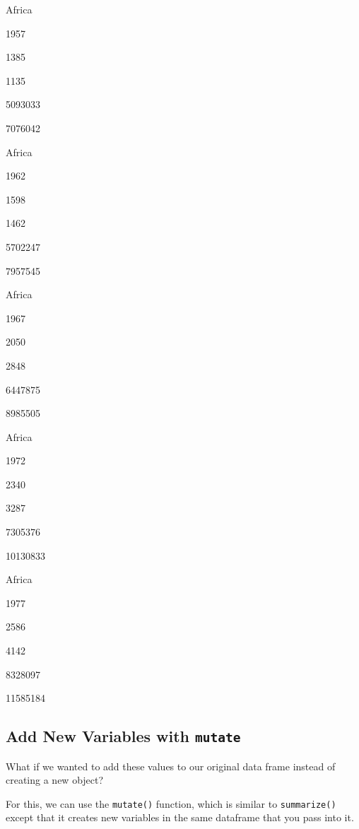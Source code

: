 \documentclass[]{book}
\newenvironment{Shaded}{\begin{snugshade}}{\end{snugshade}}
\newcommand{\KeywordTok}[1]{\textcolor[rgb]{0.13,0.29,0.53}{\textbf{#1}}}
\newcommand{\DataTypeTok}[1]{\textcolor[rgb]{0.13,0.29,0.53}{#1}}
\newcommand{\StringTok}[1]{\textcolor[rgb]{0.31,0.60,0.02}{#1}}
\newcommand{\OperatorTok}[1]{\textcolor[rgb]{0.81,0.36,0.00}{\textbf{#1}}}
\newcommand{\NormalTok}[1]{#1}
\begin{document}
Africa

1957

1385

1135

5093033

7076042

Africa

1962

1598

1462

5702247

7957545

Africa

1967

2050

2848

6447875

8985505

Africa

1972

2340

3287

7305376

10130833

Africa

1977

2586

4142

8328097

11585184

\subsection{\texorpdfstring{Add New Variables with
\texttt{mutate}}{Add New Variables with mutate}}\label{add-new-variables-with-mutate}

What if we wanted to add these values to our original data frame instead
of creating a new object?

For this, we can use the \texttt{mutate()} function, which is similar to
\texttt{summarize()} except that it creates new variables in the same
dataframe that you pass into it.

\begin{Shaded}
\end{Shaded}
\end{document}
